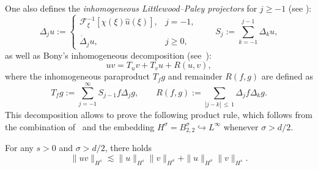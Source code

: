 \documentclass[10pt]{amsart}
\theoremstyle{definition}\newtheorem{defi}[theo]{Definition}\newtheorem{rema}[theo]{Remark}\newtheorem{exam}[theo]{Example}\newtheorem{exem}[theo]{Example}\newtheorem{nota}[theo]{Notation}
\newcommand{\FF}{\mathcal{F}}
\renewcommand*\le{\leqslant}
\renewcommand*\ge{\geqslant}
\begin{document}
One also defines the \emph{inhomogeneous Littlewood--Paley projectors} for $j \ge -1$ (see \cite[Section~2.2]{BCD2011}):
\[
\Delta_j u :=
\begin{cases}
\FF^{-1}_\xi \left[\chi(\xi) \widehat{u}(\xi) \right], & j = -1, \\
\\
\dot{\Delta}_j u, & j \ge 0,
\end{cases} \qquad S_j := \sum_{k = -1}^{j-1} \Delta_k u,
\]
as well as Bony's inhomogeneous decomposition (see~\cite[Section~2.8.1]{BCD2011}):
\[
uv = T_u v + T_v u + R(u, v),
\]
where the inhomogeneous paraproduct $T_f g$ and remainder $R(f, g)$ are defined as
\[
T_f g := \sum_{j=-1}^\infty S_{j-1} f \Delta_j g, \qquad R(f, g) := \sum_{|j - k|\,\le\,1} \Delta_j f \Delta_k g.
\]
This decomposition allows to prove the following product rule, which follows from the combination of~\cite[Corollary~2.86]{BCD2011} and the embedding $H^{\sigma} = B^{\sigma}_{2, 2} \hookrightarrow L^\infty$ whenever $\sigma > d/2$.
\begin{prop}
For any $s > 0$ and $\sigma > d/2$, there holds
\[
\| u v \|_{H^s} \lesssim \| u \|_{H^s} \| v \|_{H^\sigma} + \| u \|_{H^\sigma} \| v \|_{H^s}.
\]
\end{prop}
\end{document}
